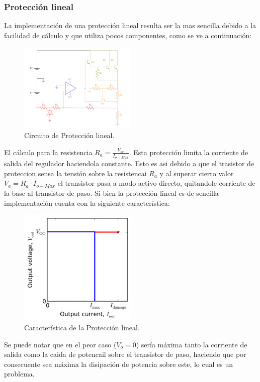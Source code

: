 \subsubsection{Protección lineal}
La implementación de una protección lineal resulta ser la mas sencilla debido a la facilidad de cálculo y que utiliza pocos componentes, como se ve a continuación:
\begin{figure}[H]
\centering
	\includegraphics[width=0.5\textwidth, page=3]{ImagenesEjercicio2/Regulador.pdf}
	\caption{Circuito de Protección lineal.}
	\label{fig:circuitolineal}
\end{figure}
El cálculo para la resistencia $R_a= \frac{V_{be}}{I_{o-Max}}$.
Esta protección limita la corriente de salida del regulador haciendola constante. Esto es asi debido a que el trasistor de proteccion sensa la tensión sobre la resistencai $R_a$ y al superar cierto valor $V_a = R_a \cdot I_{o-Max} $ el transistor pasa a modo activo directo, quitandole corriente de la base al transistor de paso.
Si bien la protección lineal es de sencilla implementación cuenta con la siguiente característica:
\begin{figure}[H]
\centering
	\includegraphics[width=0.5\textwidth]{ImagenesEjercicio2/Linearprotection.png}
	\caption{Característica de la Protección lineal.}
	\label{fig:circuitolinealcarac}
\end{figure}
Se puede notar que en el  peor caso ($V_o = 0$) sería máxima tanto la corriente de salída como la caida de potencail sobre el transistor de paso, haciendo que por consecuente sea máxima la disipación de potencia sobre este, lo cual es un problema.
